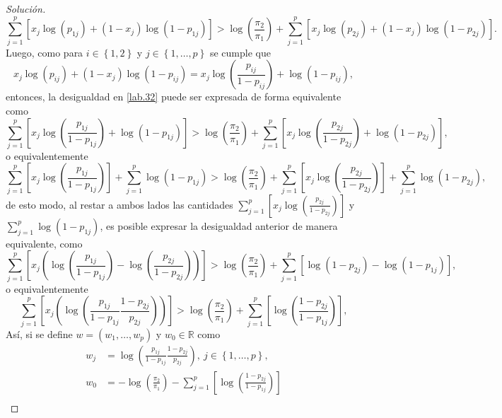 \documentclass[10.5pt,notitlepage]{article}
\newenvironment{solucion}
  {\begin{proof}[Solución]}
  {\end{proof}}
\newcommand{\RR}{\mathbb{R}}
\newcommand{\corch}[1]{\left[ #1 \right]}
\newcommand{\kis}[1]{\left\{ #1 \right\}}
\newcommand{\pare}[1]{\left( #1 \right)}
\theoremstyle{plain}
\begin{document}
\begin{solucion}
\begin{equation}\label{lab.32}
    \sum_{j = 1}^{p}\corch{x_j\log(p_{1j}) + (1 - x_{j})\log(1 - p_{1j})} > \log\pare{ \frac{\pi_{2}}{\pi_{1}}} + \sum_{j = 1}^{p}\corch{x_j\log(p_{2j}) + (1 - x_{j})\log(1 - p_{2j})}.
\end{equation}
Luego, como para \(i \in \kis{1,2}\) y \(j \in \kis{1, \hdots, p}\) se cumple que 
\[x_{j}\log(p_{ij}) + (1 - x_{j})\log(1 - p_{ij}) = x_{j}\log\pare{\frac{p_{ij}}{1 - p_{ij}}} + \log(1 - p_{ij}),\]
entonces, la desigualdad en \eqref{lab.32} puede ser expresada de forma equivalente como
\begin{equation*}
    \sum_{j = 1}^{p}\corch{x_{j}\log\pare{\frac{p_{1j}}{1 - p_{1j}}} + \log(1 - p_{1j})} > \log\pare{ \frac{\pi_{2}}{\pi_{1}}} + \sum_{j = 1}^{p}\corch{x_{j}\log\pare{\frac{p_{2j}}{1 - p_{2j}}} + \log(1 - p_{2j})},
\end{equation*}
o equivalentemente 
\begin{equation*}
   \sum_{j = 1}^{p}\corch{x_{j}\log\pare{\frac{p_{1j}}{1 - p_{1j}}}}+  \sum_{j = 1}^{p}\log(1 - p_{1j}) > \log\pare{ \frac{\pi_{2}}{\pi_{1}}} + \sum_{j = 1}^{p}\corch{x_{j}\log\pare{\frac{p_{2j}}{1 - p_{2j}}}} +  \sum_{j = 1}^{p}\log(1 - p_{2j}),
\end{equation*}
de esto modo, al restar a ambos lados las cantidades \(\sum_{j = 1}^{p}\corch{x_{j}\log\pare{\frac{p_{2j}}{1 - p_{2j}}}}\) y \( \sum_{j = 1}^{p}\log(1 - p_{1j})\), es posible expresar la desigualdad anterior de manera equivalente, como
\begin{equation*}
     \sum_{j = 1}^{p}\corch{x_{j}\pare{\log\pare{\frac{p_{1j}}{1 - p_{1j}}} - \log\pare{\frac{p_{2j}}{1 - p_{2j}}}}} >   \log\pare{ \frac{\pi_{2}}{\pi_{1}}} + \sum_{j = 1}^{p}\corch{\log(1 - p_{2j})-\log(1 - p_{1j})}, 
\end{equation*}
o equivalentemente 
\begin{equation}\label{lades}
         \sum_{j = 1}^{p}\corch{x_{j}\pare{\log\pare{\frac{p_{1j}}{1 - p_{1j}}\frac{1 - p_{2j}}{p_{2j}}}}} >   \log\pare{ \frac{\pi_{2}}{\pi_{1}}} + \sum_{j = 1}^{p}\corch{\log\pare{\frac{1 - p_{2j}}{1 - p_{1j}}}}, 
\end{equation}
Así, si se define \(w = (w_1, \hdots, w_p)\) y \(w_0 \in \RR\) como 
\begin{align}
      w_j &= \log\pare{\frac{p_{1j}}{1 - p_{1j}}\frac{1 - p_{2j}}{p_{2j}}},\  j \in \kis{1, \hdots, p}, \nonumber\\ 
      w_0 &= -\log\pare{ \frac{\pi_{2}}{\pi_{1}}} - \sum_{j = 1}^{p}\corch{\log\pare{\frac{1 - p_{2j}}{1 - p_{1j}}}}\nonumber\\

\end{align}
\end{solucion}
\end{document}
